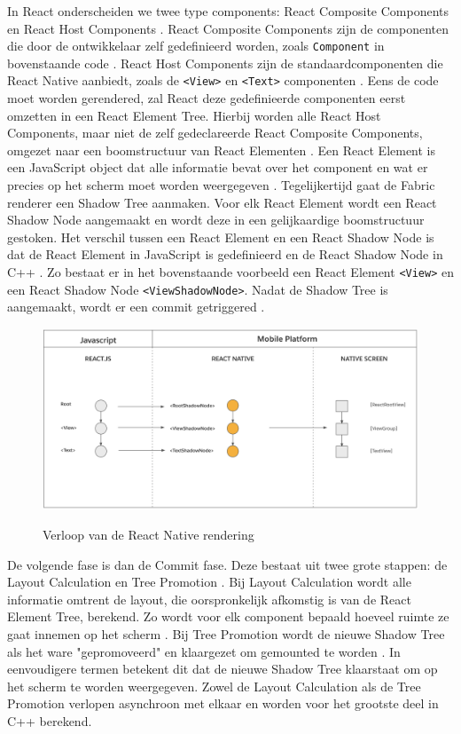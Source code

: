 In React onderscheiden we twee type components: React Composite Components en React Host Components \autocite{Bron15}. React Composite Components zijn de componenten die door de ontwikkelaar zelf gedefinieerd worden, zoals \verb|Component| in bovenstaande code \autocite{Bron16}. React Host Components zijn de standaardcomponenten die React Native aanbiedt, zoals de \verb|<View>| en \verb|<Text>| componenten \autocite{Bron16}. Eens de code moet worden gerendered, zal React deze gedefinieerde componenten eerst omzetten in een React Element Tree. Hierbij worden alle React Host Components, maar niet de zelf gedeclareerde React Composite Components, omgezet naar een boomstructuur van React Elementen \autocite{Bron15}. Een React Element is een JavaScript object dat alle informatie bevat over het component en wat er precies op het scherm moet worden weergegeven \autocite{Bron16}. Tegelijkertijd gaat de Fabric renderer een Shadow Tree aanmaken. Voor elk React Element wordt een React Shadow Node aangemaakt en wordt deze in een gelijkaardige boomstructuur gestoken. Het verschil tussen een React Element en een React Shadow Node is dat de React Element in JavaScript is gedefinieerd en de React Shadow Node in C++ \autocite{Bron16}. Zo bestaat er in het bovenstaande voorbeeld een React Element \verb|<View>| en een React Shadow Node \verb|<ViewShadowNode>|. Nadat de Shadow Tree is aangemaakt, wordt er een commit getriggered \autocite{Bron15}.

\begin{figure}
  \centering
  \includegraphics[width=0.9\linewidth]{img/reactNativeRender}
  \caption{Verloop van de React Native rendering}
  \label{fig:Verloop van de React Native rendering} \autocite{Bron15IMG}
\end{figure}

De volgende fase is dan de Commit fase. Deze bestaat uit twee grote stappen: de Layout Calculation en Tree Promotion \autocite{Bron15}. Bij Layout Calculation wordt alle informatie omtrent de layout, die oorspronkelijk afkomstig is van de React Element Tree, berekend. Zo wordt voor elk component bepaald hoeveel ruimte ze gaat innemen op het scherm \autocite{Bron15}. Bij Tree Promotion wordt de nieuwe Shadow Tree als het ware "gepromoveerd" en klaargezet om gemounted te worden \autocite{Bron15}. In eenvoudigere termen betekent dit dat de nieuwe Shadow Tree klaarstaat om op het scherm te worden weergegeven. Zowel de Layout Calculation als de Tree Promotion verlopen asynchroon met elkaar en worden voor het grootste deel in C++ berekend.

